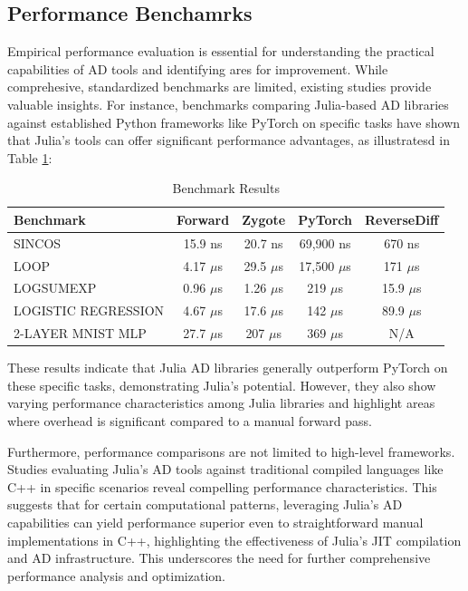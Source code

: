 \documentclass[conference]{IEEEtran}
\begin{document}
\subsection{Performance Benchamrks}
Empirical performance evaluation is essential for understanding the practical 
capabilities of AD tools and identifying ares for improvement. While comprehesive, 
standardized benchmarks are limited, existing studies provide valuable insights. For 
instance, benchmarks comparing Julia-based AD libraries against established Python 
frameworks like PyTorch on specific tasks have shown that Julia's tools can offer 
significant performance advantages, as illustratesd in Table \ref{tab:benchmark}:

\begin{table}[ht]
    \caption{Benchmark Results \cite{b1}}
    \centering
    \scriptsize
    \begin{tabular}{lcccc}
    \hline
    \textbf{Benchmark} & \textbf{Forward} & \textbf{Zygote} & \textbf{PyTorch} & \textbf{ReverseDiff} \\
    \hline
    SINCOS & 15.9 ns & 20.7 ns & 69,900 ns & 670 ns \\
    LOOP & 4.17 $\mu$s & 29.5 $\mu$s & 17,500 $\mu$s & 171 $\mu$s \\
    LOGSUMEXP & 0.96 $\mu$s & 1.26 $\mu$s & 219 $\mu$s & 15.9 $\mu$s \\
    LOGISTIC REGRESSION & 4.67 $\mu$s & 17.6 $\mu$s & 142 $\mu$s & 89.9 $\mu$s \\
    2-LAYER MNIST MLP & 27.7 $\mu$s & 207 $\mu$s & 369 $\mu$s & N/A \\
    \hline
    \end{tabular}
    \label{tab:benchmark}
\end{table}

These results indicate that Julia AD libraries generally outperform PyTorch on these 
specific tasks, demonstrating Julia's potential. However, they also show varying performance 
characteristics among Julia libraries and highlight areas where overhead is significant 
compared to a manual forward pass.

Furthermore, performance comparisons are not limited to high-level frameworks. Studies 
evaluating Julia's AD tools against traditional compiled languages like C++ in specific 
scenarios reveal compelling performance characteristics. This suggests that for certain 
computational patterns, leveraging Julia's AD capabilities can yield performance 
superior even to straightforward manual implementations in C++, highlighting the 
effectiveness of Julia's JIT compilation and AD infrastructure. 
This underscores the need for further comprehensive performance analysis and optimization.
\end{document}
